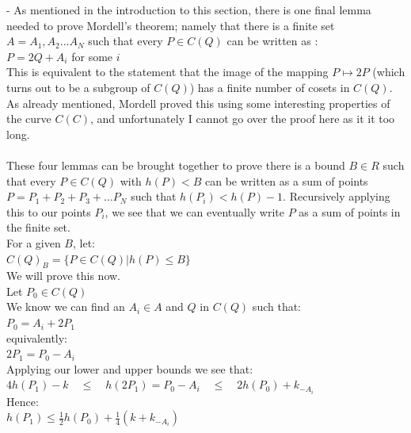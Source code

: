\documentclass{article}
\begin{document}
- As mentioned in the introduction to this section, there is one final lemma needed to prove Mordell's theorem; namely that there is a finite set $A = {A_1, A_2 ... A_N}$ such that every $P \in C(Q)$ can be written as :\\

$P = 2Q + A_i$ for some $i$\\

This is equivalent to the statement that the image of the mapping $P \mapsto 2P$ (which turns out to be a subgroup of $C(Q)$) has a finite number of cosets in $C(Q)$. As already mentioned, Mordell proved this using some interesting properties of the curve $C(C)$, and unfortunately I cannot go over the proof here as it it too long.\\
 \\
These four lemmas can be brought together to prove there is a bound $B \in R$ such that every $P \in C(Q)$ with $h(P) < B$ can be written as a sum of points $P = P_1 + P_2 + P_3 + \dots P_N$ such that $h(P_i) < h(P) - 1$. Recursively applying this to our points $P_i$, we see that we can eventually write $P$ as a sum of points in the finite set.\\

For a given $B$, let:\\

$C(Q)_B = \{P \in C(Q) | h(P) \leq B\}$\\

We will prove this now.\\

Let $P_0 \in C(Q)$\\

We know we can find an $A_i \in A$ and $Q$ in $C(Q)$ such that:\\

$P_0 = A_i + 2P_1$\\

equivalently:\\

$2P_1 = P_0 - A_i$\\

Applying our lower and upper bounds we see that:\\

$4h(P_1) - k \quad \leq \quad  h(2P_1) =  P_0 - A_i  \quad  \leq  \quad  2h(P_0) + k_{-A_i} $\\

Hence:\\

$h(P_1) \leq \frac{1}{2}h(P_0) + \frac{1}{4} (k + k_{-A_i})$\\
\end{document}
